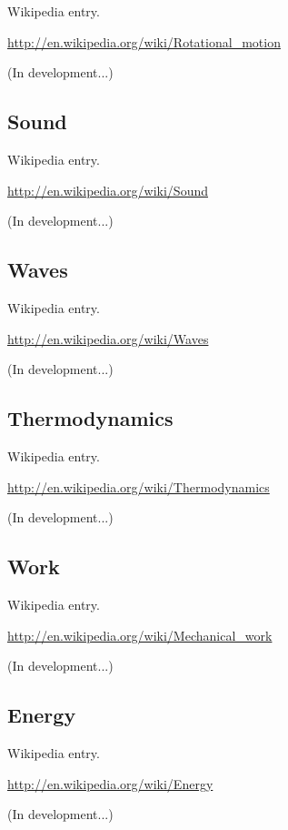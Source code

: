 \documentclass[12pt,twoside]{book}
\begin{document}
Wikipedia entry.

\href{http://en.wikipedia.org/wiki/Rotational_motion}{http://en.wikipedia.org/wiki/Rotational\_motion}

(In development...)

\subsection[Sound]{Sound}

Wikipedia entry.

\href{http://en.wikipedia.org/wiki/Sound}{http://en.wikipedia.org/wiki/Sound}

(In development...)

\subsection[Waves]{Waves}

Wikipedia entry.

\href{http://en.wikipedia.org/wiki/Waves}{http://en.wikipedia.org/wiki/Waves}

(In development...)

\subsection[Thermodynamics]{Thermodynamics}

Wikipedia entry.

\href{http://en.wikipedia.org/wiki/Thermodynamics}{http://en.wikipedia.org/wiki/Thermodynamics}

(In development...)

\subsection[Work]{Work}

Wikipedia entry.

\href{http://en.wikipedia.org/wiki/Mechanical_work}{http://en.wikipedia.org/wiki/Mechanical\_work}

(In development...)

\subsection[Energy]{Energy}

Wikipedia entry.

\href{http://en.wikipedia.org/wiki/Energy}{http://en.wikipedia.org/wiki/Energy}

(In development...)
\end{document}
